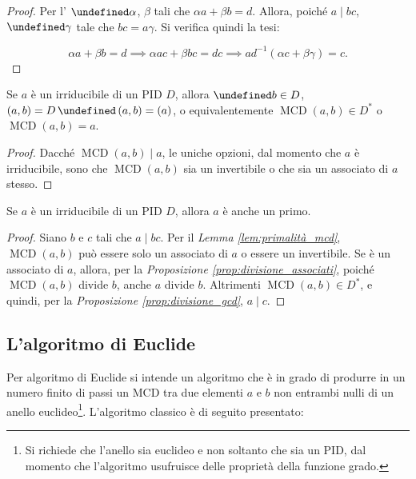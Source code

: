 \documentclass[a4paper]{article}
\DeclareMathOperator{\MCD}{MCD}
\let\oldforall\forall
\let\forall\undefined
\DeclareMathOperator{\forall}{\oldforall}
\let\oldexists\exists
\let\exists\undefined
\DeclareMathOperator{\exists}{\oldexists}
\let\oldlor\lor
\let\lor\undefined
\DeclareMathOperator{\lor}{\oldlor}
\begin{document}
\begin{proof}
    Per l' $\exists \alpha$, $\beta$ tali che
    $\alpha a + \beta b = d$. Allora, poiché $a \mid bc$, $\exists
        \gamma$ tale che $bc=a\gamma$. Si verifica quindi la tesi:

    \[ \alpha a + \beta b = d \implies \alpha ac + \beta bc = dc \implies
        a d^{-1} (\alpha c + \beta \gamma) = c.\]
\end{proof}

\begin{lemma}
    \label{lem:primalità_mcd}
    Se $a$ è un irriducibile di un PID $D$, allora $\forall b \in D$,
    $(a,b)=D \,\lor\, (a,b)=(a)$, o equivalentemente $\MCD(a,b) \in D^*$ o
    $\MCD(a,b) = a$.
\end{lemma}

\begin{proof}
    Dacché $\MCD(a,b) \mid a$, le uniche opzioni, dal momento che $a$ è irriducibile,
    sono che $\MCD(a,b)$ sia un invertibile o che sia un associato
    di $a$ stesso.
\end{proof}

\begin{theorem}
    \label{th:irriducibili_primi}
    Se $a$ è un irriducibile di un PID $D$, allora $a$ è anche un primo.
\end{theorem}

\begin{proof}
    Siano $b$ e $c$ tali che $a \mid bc$. Per il \textit{Lemma \ref{lem:primalità_mcd}},
    $\MCD(a,b)$ può essere solo un associato di $a$ o essere un invertibile. Se è
    un associato di $a$, allora, per la \textit{Proposizione \ref{prop:divisione_associati}}, poiché $\MCD(a,b)$ divide $b$, anche $a$ divide $b$.
    Altrimenti $\MCD(a,b) \in D^*$, e quindi, per la \textit{Proposizione \ref{prop:divisione_gcd}}, $a \mid c$.
\end{proof}

\subsection{L'algoritmo di Euclide}

Per algoritmo di Euclide si intende un algoritmo che è in grado di
produrre in un numero finito di passi un MCD tra due elementi
$a$ e $b$ non entrambi nulli di un anello euclideo\footnote{Si richiede che l'anello sia
    euclideo e non soltanto che sia un PID, dal momento che l'algoritmo
    usufruisce delle proprietà della funzione grado.}. L'algoritmo
classico è di seguito presentato:
\end{document}
